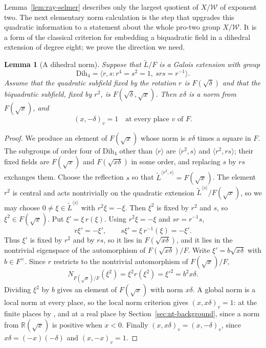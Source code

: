 \documentclass[11pt]{article}
\theoremstyle{plain}
\newtheorem{lemma}[theorem]{Lemma}
\theoremstyle{definition}
\theoremstyle{remark}
\begin{document}
Lemma~\ref{lem:ray-selmer} describes only the largest quotient of
$X/\mathcal W$ of exponent two.  The next elementary norm calculation is
the step that upgrades this quadratic information to a statement about
the whole pro-two group $X/\mathcal W$.  It is a form of the classical
criterion for embedding a biquadratic field in a dihedral extension of
degree eight; we prove the direction we need.

\begin{lemma}[A dihedral norm]\label{lem:dihedral-norm}
Suppose that $\widetilde L/F$ is a Galois extension with group
\[
 \mathrm{Dih}_4=\langle r,s:r^4=s^2=1,
                          \ srs=r^{-1}\rangle.
\]
Assume that the quadratic subfield fixed by the rotation $r$ is
$F(\sqrt\delta)$ and that the biquadratic subfield, fixed by $r^2$, is
$F(\sqrt\delta,\sqrt x)$.  Then $x\delta$ is a norm from $F(\sqrt x)$, and
\[
 (x,-\delta)_v=1\quad\text{at every place }v\text{ of }F.
\]
\end{lemma}

\begin{proof}
We produce an element of $F(\sqrt x)$ whose norm is $x\delta$ times a
square in $F$.  The subgroups of order four of $\mathrm{Dih}_4$ other
than $\langle r\rangle$ are $\langle r^2,s\rangle$ and
$\langle r^2,rs\rangle$; their fixed fields are $F(\sqrt x)$ and
$F(\sqrt{x\delta})$ in some order, and replacing $s$ by $rs$ exchanges
them.  Choose the reflection $s$ so that
$\widetilde L^{\langle r^2,s\rangle}=F(\sqrt x)$.  The element $r^2$ is
central and acts nontrivially on the quadratic extension
$\widetilde L^{\langle s\rangle}/F(\sqrt x)$, so we may choose
$0\ne\xi\in\widetilde L^{\langle s\rangle}$ with $r^2\xi=-\xi$.  Then
$\xi^2$ is fixed by $r^2$ and $s$, so $\xi^2\in F(\sqrt x)$.  Put
$\xi'=\xi\,r(\xi)$.  Using $r^2\xi=-\xi$ and $sr=r^{-1}s$,
\[
 r\xi'=-\xi',\qquad
 s\xi'=\xi\, r^{-1}(\xi)=-\xi'.
\]
Thus $\xi'$ is fixed by $r^2$ and by $rs$, so it lies in
$F(\sqrt{x\delta})$, and it lies in the nontrivial eigenspace of the
automorphism of $F(\sqrt{x\delta})/F$.  Write $\xi'=b\sqrt{x\delta}$ with
$b\in F^\times$.  Since $r$ restricts to the nontrivial automorphism of
$F(\sqrt x)/F$,
\[
 N_{F(\sqrt x)/F}(\xi^2)=\xi^2r(\xi^2)=\xi'^2=b^2x\delta.
\]
Dividing $\xi^2$ by $b$ gives an element of $F(\sqrt x)$ with norm
$x\delta$.  A global norm is a local norm at every place, so the local
norm criterion gives $(x,x\delta)_v=1$: at the finite places by
\cite[Chapter~III, Theorem~4.4]{MilneCFT}, and at a real place by
Section~\ref{sec:nt-background}, since a norm from $\mathbb R(\sqrt x)$ is
positive when $x<0$.  Finally $(x,x\delta)_v=(x,-\delta)_v$, since
$x\delta=(-x)(-\delta)$ and $(x,-x)_v=1$.
\end{proof}
\end{document}
